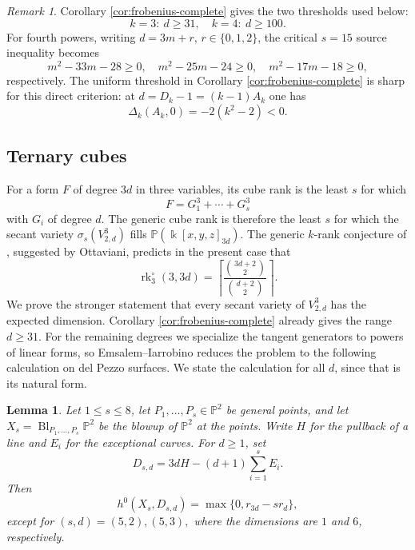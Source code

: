 \documentclass[11pt]{amsart}
\newtheorem{lemma}[theorem]{Lemma}
\theoremstyle{remark}
\newtheorem{remark}[theorem]{Remark}
\newcommand{\PP}{\mathbb P}
\newcommand{\kk}{\Bbbk}
\begin{document}
\begin{remark}\label{rem:frobenius-thresholds}
Corollary \ref{cor:frobenius-complete} gives the two thresholds used below:
$$
k=3:\ d\ge31,
\quad
k=4:\ d\ge100.
$$
For fourth powers, writing $d=3m+r$, $r\in\{0,1,2\}$, the critical $s=15$ source inequality becomes
$$
m^2-33m-28\ge0,
\quad
m^2-25m-24\ge0,
\quad
m^2-17m-18\ge0,
$$
respectively. The uniform threshold in Corollary \ref{cor:frobenius-complete} is sharp for this direct criterion: at $d=D_k-1=(k-1)A_k$ one has
$$
\Delta_k(A_k,0)=-2(k^2-2)<0.
$$
\end{remark}


\subsection{Ternary cubes}\label{subsec:ternary-cubes}

For a form $F$ of degree $3d$ in three variables, its cube rank is the least $s$ for which
$$
F=G_1^3+\cdots+G_s^3
$$
with $G_i$ of degree $d$. The generic cube rank is therefore the least $s$ for which the secant variety $\sigma_s(V^3_{2,d})$ fills $\PP(\kk[x,y,z]_{3d})$. The generic $k$-rank conjecture of \cite[Conjecture~1.2]{LORS}, suggested by Ottaviani, predicts in the present case that
$$
\operatorname{rk}^{\circ}_3(3,3d)
=
\left\lceil\frac{\binom{3d+2}{2}}{\binom{d+2}{2}}\right\rceil.
$$
We prove the stronger statement that every secant variety of $V^3_{2,d}$ has the expected dimension. Corollary \ref{cor:frobenius-complete} already gives the range $d\ge31$. For the remaining degrees we specialize the tangent generators to powers of linear forms, so Emsalem--Iarrobino reduces the problem to the following calculation on del Pezzo surfaces. We state the calculation for all $d$, since that is its natural form.

\begin{lemma}\label{lem:cube-fat-points}
Let $1\le s\le8$, let $P_1,\ldots,P_s\in\PP^2$ be general points, and let
$
X_s=\operatorname{Bl}_{P_1,\ldots,P_s}\PP^2
$
be the blowup of $\mathbb{P}^2$ at the points. Write $H$ for the pullback of a line and $E_i$ for the exceptional curves. For $d\ge1$, set
$$
D_{s,d}=3dH-(d+1)\sum_{i=1}^sE_i.
$$
Then
$$
h^0(X_s,D_{s,d})
=
\max\{0,r_{3d}-sr_d\},
$$
except for
$
(s,d)=(5,2),(5,3),
$
where the dimensions are $1$ and $6$, respectively.
\end{lemma}
\end{document}
